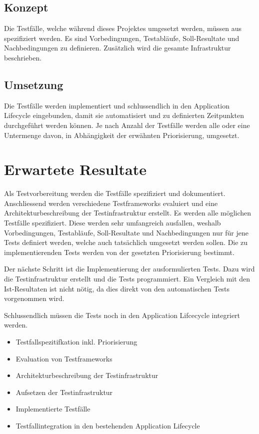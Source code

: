 \subsection{Konzept}
Die Testfälle, welche während dieses Projektes umgesetzt werden, müssen aus spezifiziert werden. Es sind Vorbedingungen, Testabläufe, Soll-Resultate und Nachbedingungen zu definieren. Zusätzlich wird die gesamte Infrastruktur beschrieben.

\subsection{Umsetzung}
Die Testfälle werden implementiert und schlussendlich in den Application Lifecycle eingebunden, damit sie automatisiert und zu definierten Zeitpunkten durchgeführt werden können.
Je nach Anzahl der Testfälle werden alle oder eine Untermenge davon, in Abhängigkeit der erwähnten Priorisierung, umgesetzt.

\section{Erwartete Resultate}
Als Testvorbereitung werden die Testfälle spezifiziert und dokumentiert. Anschliessend werden verschiedene Testframeworks evaluiert und eine Architekturbeschreibung der Testinfrastruktur erstellt.
Es werden alle möglichen Testfälle spezifiziert. Diese werden sehr umfangreich ausfallen, weshalb Vorbedingungen, Testabläufe, Soll-Resultate und Nachbedingungen nur für jene Tests definiert werden, welche auch tatsächlich umgesetzt werden sollen. Die zu implementierenden Tests werden von der gesetzten Priorisierung bestimmt.

Der nächste Schritt ist die Implementierung der ausformulierten Tests. Dazu wird die Testinfrastruktur erstellt und die Tests programmiert. Ein Vergleich mit den Ist-Resultaten ist nicht nötig, da dies direkt von den automatischen Tests vorgenommen wird.

Schlussendlich müssen die Tests noch in den Application Lifcecycle integriert werden.

\begin{itemize}
\item Testfallspezitifkation inkl. Priorisierung
\item Evaluation von Testframeworks
\item Architekturbeschreibung der Testinfrastruktur
\item Aufsetzen der Testinfrastruktur
\item Implementierte Testfälle
\item Testfallintegration in den bestehenden Application Lifecycle
\end{itemize}